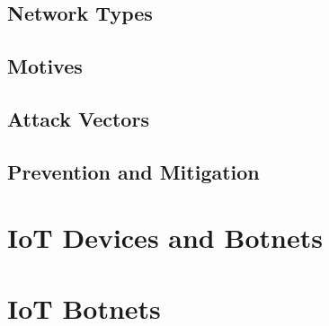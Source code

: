 

\subsection{Network Types}



\subsection{Motives}



\subsection{Attack Vectors}



\subsection{Prevention and Mitigation}



\section{IoT Devices and Botnets}



\section{IoT Botnets}


